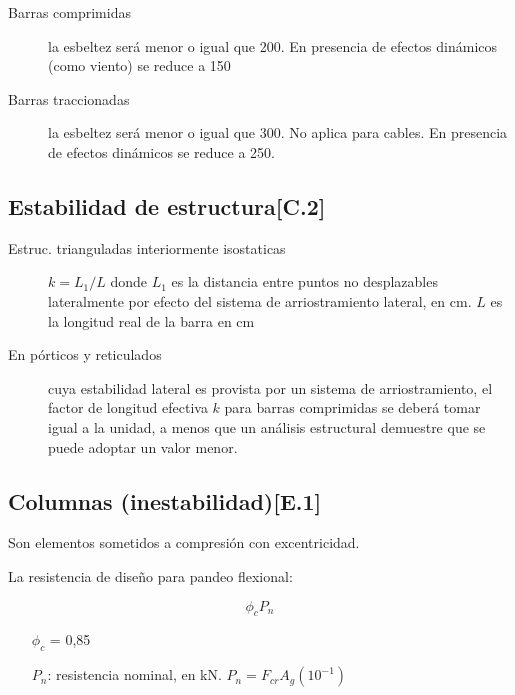 \documentclass[twocolumn]{article}
\begin{document}
\begin{description}
	\item[Barras comprimidas] la esbeltez será menor o igual que 200. En presencia de efectos dinámicos (como viento) se reduce a 150
	\item[Barras traccionadas] la esbeltez será menor o igual que 300. No aplica para cables.  En presencia de efectos dinámicos se reduce a 250. 
\end{description}

\subsection{Estabilidad de estructura[C.2]}

\begin{description}
	\item[Estruc. trianguladas interiormente isostaticas] $k = L_1/L$ donde $L_1$ es la distancia entre puntos no desplazables lateralmente por efecto del sistema de arriostramiento lateral, en cm. $L$ es la longitud real de la barra en cm
	\item[En pórticos y reticulados] cuya estabilidad lateral es provista por un sistema de
	arriostramiento, el factor de longitud efectiva $k$ para barras comprimidas se deberá tomar
	igual a la unidad, a menos que un análisis estructural demuestre que se puede adoptar un valor menor.
\end{description}


\subsection{Columnas (inestabilidad)[E.1]}
Son elementos sometidos a compresión con excentricidad. 

La resistencia de diseño para pandeo flexional:

\[
\phi_c P_n
\]
\begin{itemize}
	\item[$\phi_c$] = 0,85
	\item[$P_n$:] resistencia nominal, en kN. $P_{n}=F_{c r} A_{g}\left(10^{-1}\right)$ 
\end{itemize}
\end{document}
